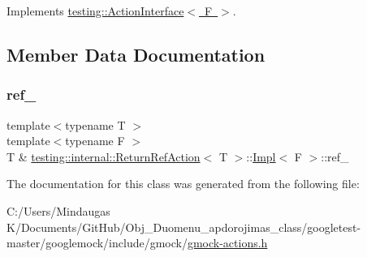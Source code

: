 Implements \mbox{\hyperlink{classtesting_1_1_action_interface_a20f8624fcea1786f2992b358760422a0}{testing\+::\+Action\+Interface$<$ F $>$}}.



\subsection{Member Data Documentation}
\mbox{\label{classtesting_1_1internal_1_1_return_ref_action_1_1_impl_adff308a917bb806ea09f56348ee42c5f}} 
\subsubsection{\texorpdfstring{ref\_}{ref\_}}
{\footnotesize\ttfamily template$<$typename T $>$ \\
template$<$typename F $>$ \\
T \& \mbox{\hyperlink{classtesting_1_1internal_1_1_return_ref_action}{testing\+::internal\+::\+Return\+Ref\+Action}}$<$ T $>$\+::\mbox{\hyperlink{classtesting_1_1internal_1_1_return_ref_action_1_1_impl}{Impl}}$<$ F $>$\+::ref\+\_\+\hspace{0.3cm}{\ttfamily [private]}}



The documentation for this class was generated from the following file\+:\begin{DoxyCompactItemize}
\item 
C\+:/\+Users/\+Mindaugas K/\+Documents/\+Git\+Hub/\+Obj\+\_\+\+Duomenu\+\_\+apdorojimas\+\_\+class/googletest-\/master/googlemock/include/gmock/\mbox{\hyperlink{googletest-master_2googlemock_2include_2gmock_2gmock-actions_8h}{gmock-\/actions.\+h}}\end{DoxyCompactItemize}
